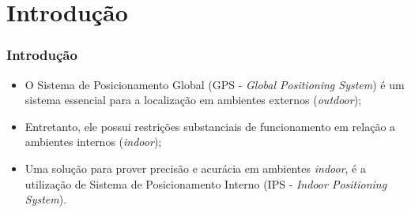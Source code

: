 \documentclass[xcolor={dvipsnames,svgnames,table}]{beamer}
\begin{document}
	\section{Introdução}
	\label{introducao}
	\begin{frame}
		\frametitle{Introdução}
		\begin{itemize}[label=\textcolor{black}{\textbullet}, left=0pt]
			\justifying
			\item {\footnotesize O Sistema de Posicionamento Global (GPS - \textit{Global Positioning System}) é um sistema essencial para a localização em ambientes externos (\textit{outdoor});}
			
			\item {\footnotesize Entretanto, ele possui restrições substanciais de funcionamento em relação a ambientes internos (\textit{indoor});}
			\item {\footnotesize Uma solução para prover precisão e acurácia em ambientes \textit{indoor}, é a utilização de Sistema de Posicionamento Interno (IPS - \textit{Indoor Positioning System}).}
		\end{itemize}
	\end{frame}
\end{document}
